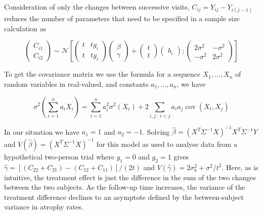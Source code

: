 \documentclass[final, paper=letter,5p,times,twocolumn]{elsarticle}
\theoremstyle{definition}
\begin{document}
{Consideration of only the changes between successive visits, $C_{ij} = Y_{ij} - Y_{i(j-1)}$ reduces the number of parameters that need to be specified in a sample size calculation as

\begin{equation*}
  \left(
  \begin{array}{c}
    C_{i1} \\
    C_{i2}
  \end{array}
  \right) \sim \mathcal{N} \left[
      \left(
  \begin{array}{cc}
    t & tg_{i} \\
    t & tg_{i}
  \end{array}
  \right)\left(
  \begin{array}{c}
    \beta \\
    \gamma
  \end{array}
  \right) + \left(
  \begin{array}{c}
    t  \\
    t 
  \end{array}
  \right)\left(
  \begin{array}{c}
    b_i
  \end{array}
  \right) ;  \left(
  \begin{array}{cc}
    2\sigma^{2} & -\sigma^{2} \\
    -\sigma^{2} & 2\sigma^{2}
  \end{array}
  \right) 
    \right]
\end{equation*}

To get the covariance matrix we use the formula for a sequence $X_{1}, \ldots, X_{n}$ of random variables in real-valued, and constants $a_{1},\ldots ,a_{n}$, we have

\begin{equation*}
  \sigma ^{2}\left( \sum _{i=1}^{n}a_{i}X_{i} \right) = \sum _{i=1}^{n}a_{i}^{2}\sigma ^{2}(X_{i})+2\sum _{i,j\,:\,i<j}a_{i}a_{j}\operatorname {cov} (X_{i},X_{j})
\end{equation*}

In our situation we have $a_{1} = 1$ and $a_{2} = -1$. Solving $\hat{\beta} = (X^{T}\Sigma^{-1}X)^{-1}X^{T}\Sigma^{-1}Y$ and $V(\hat{\beta}) = (X^{T}\Sigma^{-1}X)^{-1}$ for this model as used to analyse data from a hypothetical two-person trial where $g_{1} = 0$ and $g_{2} = 1$ gives $\hat{\gamma} = [(C_{22} + C_{21}) -(C_{12} + C_{11})]/(2t)$ and $V(\hat{\gamma}) = 2\sigma_{b}^{2} + \sigma^{2}/t^{2}$. Here, as is intuitive, the treatment effect is just the difference in the sum of the two changes between the two subjects. As the follow-up time increases, the variance of the treatment difference declines to an asymptote defined by the between-subject variance in atrophy rates.}
\end{document}
